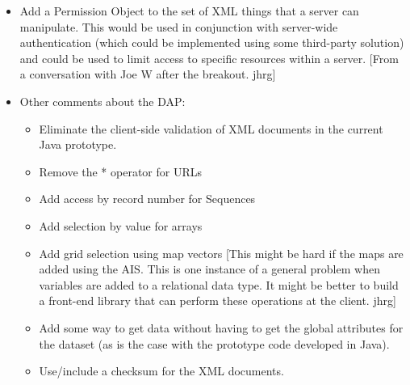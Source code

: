 \begin{itemize}
\item Add a Permission Object to the set of XML things that a server can
  manipulate. This would be used in conjunction with server-wide
  authentication (which could be implemented using some third-party solution)
  and could be used to limit access to specific resources within a server.
  [From a conversation with Joe W after the breakout. jhrg]


\item Other comments about the DAP:

  \begin{itemize}
  \item Eliminate the client-side validation of XML documents in the current Java
    prototype.
  \item Remove the * operator for URLs
  \item Add access by record number for Sequences
  \item Add selection by value for arrays
  \item Add grid selection using map vectors [This might be hard if the maps are
    added using the AIS. This is one instance of a general problem when
    variables are added to a relational data type. It might be better to
    build a front-end library that can perform these operations at the
    client. jhrg]
  \item Add some way to get data without having to get the global attributes for
    the dataset (as is the case with the prototype code developed in
    Java).
  \item Use/include a checksum for the XML documents.
  \end{itemize}
\end{itemize}
                                
%
%
%
%

